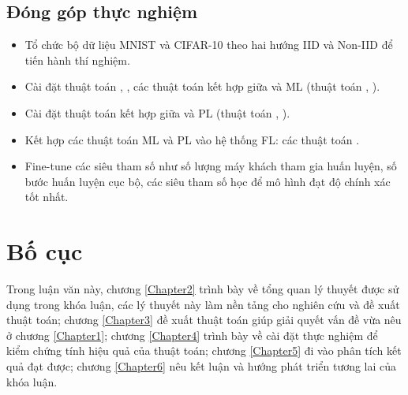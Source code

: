\subsection{Đóng góp thực nghiệm}

\begin{itemize}
    \item Tổ chức bộ dữ liệu MNIST và CIFAR-10 theo hai hướng IID và Non-IID để tiến hành thí nghiệm.
    \item Cài đặt thuật toán , , các thuật toán kết hợp giữa  và ML (thuật toán , ).
    \item Cài đặt thuật toán kết hợp giữa  và PL (thuật toán , ).
    \item Kết hợp các thuật toán ML và PL vào hệ thống FL: các thuật toán .
    \item Fine-tune các siêu tham số như số lượng máy khách tham gia huấn luyện, số bước huấn luyện cục bộ, các siêu tham số học để mô hình đạt độ chính xác tốt nhất.
\end{itemize}

\section{Bố cục}

Trong luận văn này, chương \ref{Chapter2} trình bày về tổng quan lý thuyết được sử dụng trong khóa luận, các lý thuyết này làm nền tảng cho nghiên cứu và đề xuất thuật toán; chương \ref{Chapter3} đề xuất thuật toán giúp giải quyết vấn đề vừa nêu ở chương \ref{Chapter1}; chương \ref{Chapter4} trình bày về cài đặt thực nghiệm để kiểm chứng tính hiệu quả của thuật toán; chương \ref{Chapter5} đi vào phân tích kết quả đạt được; chương \ref{Chapter6} nêu kết luận và hướng phát triển tương lai của khóa luận.
